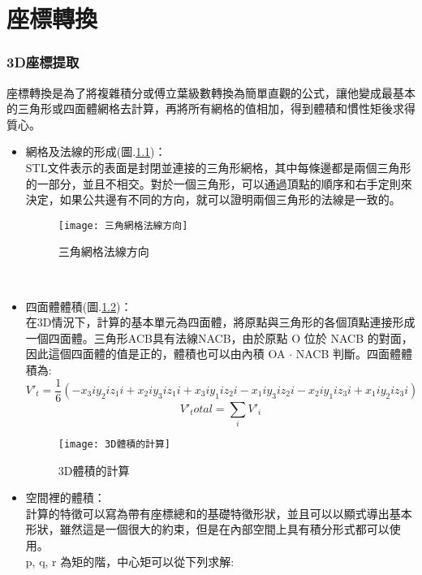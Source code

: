 \chapter{座標轉換}
\subsection{3D座標提取}

座標轉換是為了將複雜積分或傅立葉級數轉換為簡單直觀的公式，讓他變成最基本的三角形或四面體網格去計算，再將所有網格的值相加，得到體積和慣性矩後求得質心。\\

\begin{itemize}
\item 網格及法線的形成(圖.\ref{三角網格法線方向})：\\
STL文件表示的表面是封閉並連接的三角形網格，其中每條邊都是兩個三角形的一部分，並且不相交。對於一個三角形，可以通過頂點的順序和右手定則來決定，如果公共邊有不同的方向，就可以證明兩個三角形的法線是一致的。\\
\begin{figure}[hbt!]
\begin{center}
\texttt{[image: 三角網格法線方向]}
\caption{\Large 三角網格法線方向}\label{三角網格法線方向}
\end{center}
\end{figure}
\\
\item 四面體體積(圖.\ref{3D體積的計算})：\\
在3D情況下，計算的基本單元為四面體，將原點與三角形的各個頂點連接形成一個四面體。三角形ACB具有法線NACB，由於原點 O 位於 NACB 的對面，因此這個四面體的值是正的，體積也可以由內積 OA $\cdot$ NACB 判斷。四面體體積為:\\
$$ V'_t = \frac{1}{6}(-x_3i y_2i z_1i + x_2i y_3i z_1i + x_3i y_1i z_2i - x_1i y_3i z_2i - x_2i y_1i z_3i + x_1i y_2i z_3i) $$
$$ V'_total= \sum_{i}V'_i$$

\begin{figure}[hbt!]
\begin{center}
\texttt{[image: 3D體積的計算]}
\caption{\Large 3D體積的計算}\label{3D體積的計算}
\end{center}
\end{figure}
\item 空間裡的體積：\\
計算的特徵可以寫為帶有座標總和的基礎特徵形狀，並且可以以顯式導出基本形狀，雖然這是一個很大的約束，但是在內部空間上具有積分形式都可以使用。\\
 p, q, r 為矩的階，中心矩可以從下列求解:\\


\end{itemize}
